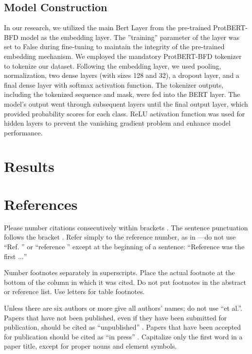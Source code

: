 \documentclass[conference]{IEEEtran}
\begin{document}
\subsection{Model Construction}


In our research, we utilized the main Bert Layer from the pre-trained ProtBERT-BFD
model as the embedding layer. The ”training” parameter of the layer was set to False
during fine-tuning to maintain the integrity of the pre-trained embedding mechanism. We
employed the mandatory ProtBERT-BFD tokenizer to tokenize our dataset. Following
the embedding layer, we used pooling, normalization, two dense layers (with sizes 128
and 32), a dropout layer, and a final dense layer with softmax activation function. The
tokenizer outputs, including the tokenized sequence and mask, were fed into the BERT
layer. The model’s output went through subsequent layers until the final output layer,
which provided probability scores for each class. ReLU activation function was used for
hidden layers to prevent the vanishing gradient problem and enhance model performance.




\section{Results}





\section*{References}

Please number citations consecutively within brackets \cite{b1}. The 
sentence punctuation follows the bracket \cite{b2}. Refer simply to the reference 
number, as in \cite{b3}---do not use ``Ref. \cite{b3}'' or ``reference \cite{b3}'' except at 
the beginning of a sentence: ``Reference \cite{b3} was the first $\ldots$''

Number footnotes separately in superscripts. Place the actual footnote at 
the bottom of the column in which it was cited. Do not put footnotes in the 
abstract or reference list. Use letters for table footnotes.

Unless there are six authors or more give all authors' names; do not use 
``et al.''. Papers that have not been published, even if they have been 
submitted for publication, should be cited as ``unpublished'' \cite{b4}. Papers 
that have been accepted for publication should be cited as ``in press'' \cite{b5}. 
Capitalize only the first word in a paper title, except for proper nouns and 
element symbols.
\end{document}
